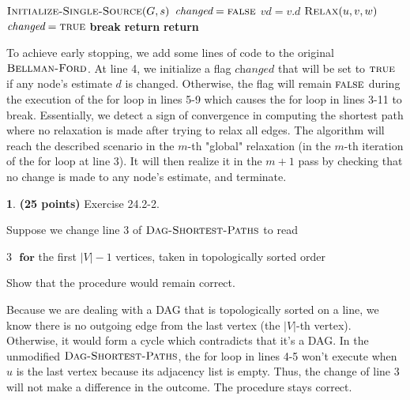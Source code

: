 \documentclass[11pt]{article}
\theoremstyle{definition}
\theoremstyle{theorem}
\newtheorem{prob}{}
\newcommand{\solution}{\medskip\noindent{\color{DarkBlue}\textbf{Solution:}}}
\begin{document}
\begin{algorithmic}[1]
	\State $\textproc{\textsc{Initialize-Single-Source}}(G, s)$
		\State $\textit{changed} = \textproc{\textsc{false}}$
			\State $\textit{vd} = v.d$
			\State $\textproc{\textsc{Relax}}(u, v, w)$
			 
				\State $\textit{changed} = \textproc{\textsc{true}}$
			\EndIf
		\EndFor
			\State \textbf{break}
		\EndIf
	\EndFor
			\State \textbf{return} 
		\EndIf
	\EndFor
	\State \textbf{return} 
\EndFunction
\end{algorithmic}

To achieve early stopping, we add some lines of code to the original $\textproc{\textsc{Bellman-Ford}}$. At line 4, we initialize a flag $\textit{changed}$ that will be set to $\textproc{\textsc{true}}$ if any node's estimate $d$ is changed. Otherwise, the flag will remain $\textproc{\textsc{false}}$ during the execution of the for loop in lines 5-9 which causes the for loop in lines 3-11 to break. Essentially, we detect a sign of convergence in computing the shortest path where no relaxation is made after trying to relax all edges. The algorithm will reach the described scenario in the $m$-th "global" relaxation (in the $m$-th iteration of the for loop at line 3). It will then realize it in the $m+1$ pass by checking that no change is made to any node's estimate, and terminate.


\newpage
\begin{prob} \textbf{(25 points)} Exercise 24.2-2.
\end{prob}

Suppose we change line 3 of $\textproc{\textsc{Dag-Shortest-Paths}}$ to read

3 $\textbf{   for}$ the first $|V| - 1$ vertices, taken in topologically sorted order

Show that the procedure would remain correct.

\solution

Because we are dealing with a DAG that is topologically sorted on a line, we know there is no outgoing edge from the last vertex (the $|V|$-th vertex). Otherwise, it would form a cycle which contradicts that it's a DAG. In the unmodified $\textproc{\textsc{Dag-Shortest-Paths}}$, the for loop in lines 4-5 won't execute when $u$ is the last vertex because its adjacency list is empty. Thus, the change of line 3 will not make a difference in the outcome. The procedure stays correct.
\end{document}
